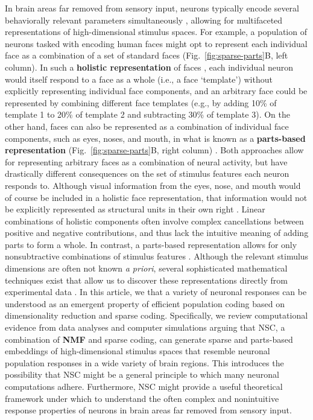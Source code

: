 In brain areas far removed from sensory input,
neurons typically encode several behaviorally relevant parameters
simultaneously \cite{Rigotti2013,Park2014,PaganRust2014,PougetSejnowski1997},
allowing for multifaceted representations of high-dimensional stimulus spaces.
For example, a population of neurons tasked with encoding human faces
might opt to represent each individual face as a combination of a set of
standard faces (Fig.~\ref{fig:sparse-parts}B, left column).
In such a \textbf{holistic representation} of faces \cite{TanakaFarah1993},
each individual neuron would itself respond to a face as a whole
(i.e., a face `template')
without explicitly representing individual face components,
and an arbitrary face could be represented by 
combining different face templates
(e.g., by adding 10\% of template 1 to 20\% of template 2
and subtracting 30\% of template 3).
On the other hand, faces can also be represented as a combination
of individual face components, such as eyes, noses, and mouth,
in what is known as a \textbf{parts-based representation}
(Fig.~\ref{fig:sparse-parts}B, right column) \cite{Palmer1977}.
Both approaches allow for representing arbitrary faces as a combination of
neural activity, but have drastically different consequences on the
set of stimulus features each neuron responds to.
Although visual information from the eyes, nose, and mouth would of course be
included in a holistic face representation,
that information would not be explicitly represented as structural units
in their own right \cite{TanakaFarah1993}.
Linear combinations of holistic components often involve complex cancellations
between positive and negative contributions,
and thus lack the intuitive meaning of adding parts to form a whole.
In contrast, a parts-based representation allows for only nonsubtractive
combinations of stimulus features \cite{Palmer1977}.
Although the relevant stimulus dimensions are often not known \emph{a priori},
several sophisticated mathematical techniques exist that
allow us to discover these representations directly from experimental data
\cite{Brunton2016,CunninghamYu2014,PillowSimoncelli2006,Sharpee2014,Gao2017,ChangTsao2017}.
In this article, we  that a variety of neuronal responses
can be understood as an emergent property of efficient population coding
based on dimensionality reduction and sparse coding.
Specifically, we review computational evidence
from data analyses and computer simulations arguing that \ac{NSC}, 
a combination of \textbf{\ac{NMF}}
\cite{PaateroTapper1994,LeeSeung1999} 
and sparse coding,
can generate sparse and parts-based embeddings of
high-dimensional stimulus spaces
that resemble neuronal population responses in a 
wide variety of brain regions.
This introduces the possibility that \ac{NSC} might
be a general principle to which many neuronal computations adhere.
Furthermore, \ac{NSC} might provide a useful theoretical framework under which
to understand the often complex and nonintuitive response properties of neurons
in brain areas far removed from sensory input.

